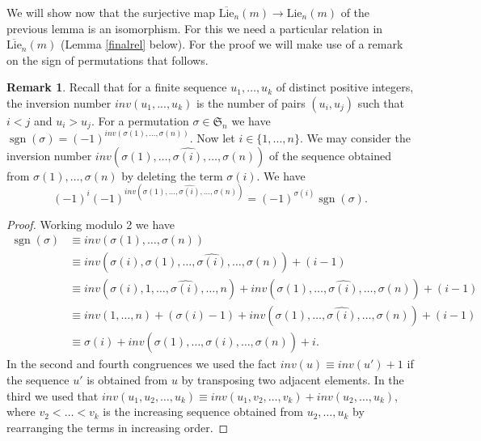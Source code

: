 \documentclass[11pt]{amsart}
\theoremstyle{definition}
\newtheorem{rem}[thm]{Remark}
\numberwithin{equation}{section}
\DeclareMathOperator{\sign}{sgn}
\begin{document}
We will show now that the surjective map $\overline{\text{Lie}}_n(m) \to \text{Lie}_n(m)$ of the previous lemma is an isomorphism. For this we need a particular relation in $\overline{\text{Lie}}_n(m)$ (Lemma \ref{finalrel} below). For the proof we will make use of a remark on the  sign of permutations that follows.
\begin{rem}\label{sign} Recall that for a finite sequence $u_1, \dots, u_k $ of distinct positive integers, the inversion number $inv(u_1,...,u_k)$ is the number of pairs $(u_i, u_j)$ such that $i<j$ and $u_i >u_j$. For a permutation $\sigma \in \mathfrak{S}_n$ we have $\sign(\sigma)= (-1)^{inv(\sigma(1), \dots,  \sigma(n))}$. Now let $i \in \{1,...,n\}$. We may consider the inversion number $inv(\sigma(1), \dots, \widehat{\sigma(i)}, \dots, \sigma(n))$ of the sequence obtained from $\sigma(1),  \dots, \sigma(n)$ by deleting the term $\sigma(i)$. We have \begin{equation}\label{inv}
(-1)^i(-1)^{inv(\sigma(1), \dots, \widehat{\sigma(i)}, \dots, \sigma(n))}=(-1)^{\sigma(i)}\sign(\sigma).
	\end{equation}
\begin{proof} Working modulo 2 we have
	\begin{align*}
\sign(\sigma) &\equiv inv(\sigma(1), \dots, \sigma(n))\\&\equiv inv(\sigma(i), \sigma(1), \dots, \widehat{\sigma(i)}, \dots, \sigma(n)) +(i-1)
\\&\equiv inv(\sigma(i), 1, \dots, \widehat{\sigma(i)}, \dots, n) + inv(\sigma(1), \dots, \widehat{\sigma(i)}, \dots, \sigma(n))+(i-1)\\&\equiv inv(1, \dots, n) + (\sigma(i)-1) + inv(\sigma(1), \dots, \widehat{\sigma(i)}, \dots, \sigma(n))+(i-1)	
\\&\equiv \sigma(i) + inv(\sigma(1), \dots, \widehat{\sigma(i)}, \dots, \sigma(n))+i.\end{align*} In the second and fourth congruences we used the fact $inv(u) \equiv inv(u')+1$ if the sequence $u'$ is obtained from $u$ by transposing two adjacent elements. In the third we used that $inv(u_1,u_2,\dots,u_k) \equiv inv(u_1,v_2,\dots,v_k) + inv(u_2,\dots,u_k)$, where $v_2 < \dots < v_k$ is the increasing sequence obtained from $u_2, \dots, u_k$ by rearranging the terms in increasing order.
\end{proof}
	\end{rem}
\end{document}
